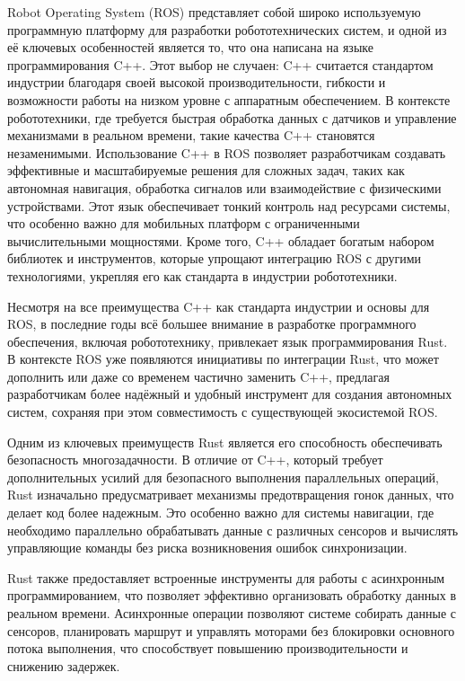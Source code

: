 Robot Operating System (ROS) представляет собой широко используемую программную
платформу для разработки робототехнических систем, и одной из её ключевых
особенностей является то, что она написана на языке программирования C++. Этот
выбор не случаен: C++ считается стандартом индустрии благодаря своей высокой
производительности, гибкости и возможности работы на низком уровне с аппаратным
обеспечением. В контексте робототехники, где требуется быстрая обработка данных
с датчиков и управление механизмами в реальном времени, такие качества C++
становятся незаменимыми. Использование C++ в ROS позволяет разработчикам
создавать эффективные и масштабируемые решения для сложных задач, таких как
автономная навигация, обработка сигналов или взаимодействие с физическими
устройствами. Этот язык обеспечивает тонкий контроль над ресурсами системы, что
особенно важно для мобильных платформ с ограниченными вычислительными
мощностями. Кроме того, C++ обладает богатым набором библиотек и инструментов,
которые упрощают интеграцию ROS с другими технологиями, укрепляя его как
стандарта в индустрии робототехники.

Несмотря на все преимущества C++ как стандарта индустрии и основы для ROS, в
последние годы всё большее внимание в разработке программного обеспечения,
включая робототехнику, привлекает язык программирования Rust. В контексте ROS
уже появляются инициативы по интеграции Rust, что может дополнить или даже со
временем частично заменить C++, предлагая разработчикам более надёжный и удобный
инструмент для создания автономных систем, сохраняя при этом совместимость с
существующей экосистемой ROS.

Одним из ключевых преимуществ Rust является его способность обеспечивать
безопасность многозадачности. В отличие от C++, который требует дополнительных
усилий для безопасного выполнения параллельных операций, Rust изначально
предусматривает механизмы предотвращения гонок данных, что делает код более
надежным. Это особенно важно для системы навигации, где необходимо параллельно
обрабатывать данные с различных сенсоров и вычислять управляющие команды без
риска возникновения ошибок синхронизации.

Rust также предоставляет встроенные инструменты для работы с асинхронным
программированием, что позволяет эффективно организовать обработку данных в
реальном времени. Асинхронные операции позволяют системе собирать данные с
сенсоров, планировать маршрут и управлять моторами без блокировки основного
потока выполнения, что способствует повышению производительности и снижению
задержек.

